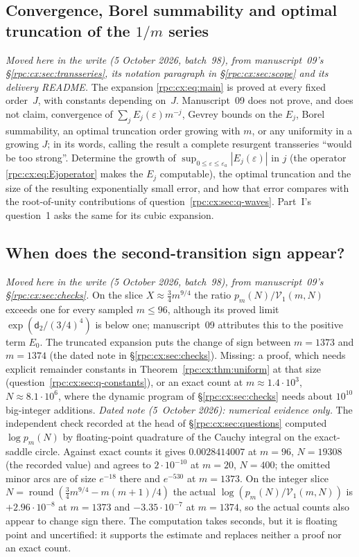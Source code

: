 \documentclass[11pt]{article}
\theoremstyle{definition}
\theoremstyle{remark}
\numberwithin{equation}{section}
\begin{document}
\subsection{Convergence, Borel summability and optimal truncation of the \texorpdfstring{$1/m$}{1/m} series}
\label{rpc:cx:sec:q-truncation}
\emph{Moved here in the write (5 October 2026, batch~98), from
manuscript~09's \S\ref{rpc:cx:sec:transseries}, its notation paragraph in
\S\ref{rpc:cx:sec:scope} and its delivery README.} The expansion
\eqref{rpc:cx:eq:main} is proved at every fixed order~$J$, with constants
depending on~$J$. Manuscript~09 does not prove, and does not claim,
convergence of $\sum_jE_j(\varepsilon)m^{-j}$, Gevrey bounds on the $E_j$,
Borel summability, an optimal truncation order growing with $m$, or any
uniformity in a growing $J$; in its words, calling the result a complete
resurgent transseries ``would be too strong''. Determine the growth of
$\sup_{0\le\varepsilon\le\varepsilon_a}|E_j(\varepsilon)|$ in $j$ (the
operator \eqref{rpc:cx:eq:Ejoperator} makes the $E_j$ computable), the
optimal truncation and the size of the resulting exponentially small error,
and how that error compares with the root-of-unity contributions of
question~\ref{rpc:cx:sec:q-waves}. Part~I's question~1 asks the same for
its cubic expansion.

\subsection{When does the second-transition sign appear?}
\label{rpc:cx:sec:q-finitesize}
\emph{Moved here in the write (5 October 2026, batch~98), from manuscript~09's
\S\ref{rpc:cx:sec:checks}.} On the slice $X\approx\tfrac34m^{9/4}$ the ratio
$p_m(N)/\mathcal V_1(m,N)$ exceeds one for every sampled $m\le96$, although
its proved limit $\exp(\mathsf d_2/(3/4)^4)$ is below one; manuscript~09
attributes this to the positive term $E_0$. The truncated expansion puts the
change of sign between $m=1373$ and $m=1374$ (the dated note in
\S\ref{rpc:cx:sec:checks}). Missing: a proof, which needs explicit
remainder constants in Theorem~\ref{rpc:cx:thm:uniform} at that size
(question~\ref{rpc:cx:sec:q-constants}), or an exact count at $m\approx1.4\cdot10^3$,
$N\approx8.1\cdot10^6$, where the dynamic program of
\S\ref{rpc:cx:sec:checks} needs about $10^{10}$ big-integer additions.
\emph{Dated note (5~October 2026): numerical evidence only.} The
independent check recorded at the head of \S\ref{rpc:cx:sec:questions}
computed $\log p_m(N)$ by floating-point quadrature of the Cauchy integral
on the exact-saddle circle. Against exact counts it gives $0.0028414007$
at $m=96$, $N=19308$ (the recorded value) and agrees to $2\cdot10^{-10}$ at
$m=20$, $N=400$; the omitted minor arcs are of size $e^{-18}$ there and
$e^{-530}$ at $m=1373$. On the integer slice
$N=\operatorname{round}(\tfrac34m^{9/4}-m(m+1)/4)$ the actual
$\log(p_m(N)/\mathcal V_1(m,N))$ is $+2.96\cdot10^{-8}$ at $m=1373$ and
$-3.35\cdot10^{-7}$ at $m=1374$, so the actual counts also appear to change
sign there. The computation takes seconds, but it is floating point and
uncertified: it supports the estimate and replaces neither a proof nor an
exact count.
\end{document}

